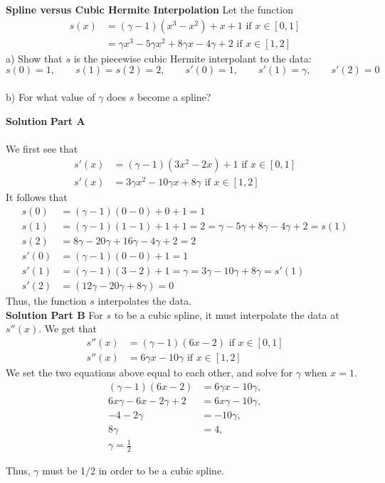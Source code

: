 \textbf{Spline versus Cubic Hermite Interpolation} Let the function 
\begin{align*}
s(x) &= (\gamma - 1)(x^3 - x^2) + x + 1 \text{ if } x \in [0, 1] \\
	 &= \gamma x^3 - 5 \gamma x^2 + 8 \gamma x - 4 \gamma + 2 \text{ if } x \in [1, 2]
\end{align*}
a) Show that $s$ is the piecewise cubic Hermite interpolant to the data:
$$s(0) = 1, \qquad s(1) = s(2) = 2, \qquad s'(0) = 1, \qquad s'(1) = \gamma, \qquad s'(2) = 0$$
\\
b) For what value of $\gamma$ does $s$ become a spline?

\textbf{Solution}
\textbf{Part A}\\
\\
We first see that
\begin{align*}
 s'(x) &= (\gamma - 1)(3x^2 - 2x) + 1 \text{ if } x \in [0, 1] \\
 s'(x) &= 3\gamma x^2 - 10 \gamma x + 8 \gamma \text{ if } x \in [1, 2]
\end{align*}
It follows that 
\begin{align*}
s(0) &= (\gamma - 1)(0 - 0) + 0 + 1 = 1\\
s(1) &= (\gamma - 1)(1 - 1) + 1 + 1 = 2 =  \gamma - 5 \gamma + 8 \gamma - 4\gamma + 2 = s(1)\\
s(2) &= 8 \gamma - 20 \gamma + 16 \gamma - 4\gamma + 2 = 2\\
s'(0) &= (\gamma - 1)(0 - 0) + 1 = 1\\
s'(1) &= (\gamma - 1)(3 - 2) + 1 = \gamma =  3 \gamma - 10 \gamma + 8\gamma = s'(1)\\
s'(2) &= (12 \gamma - 20 \gamma + 8 \gamma) = 0
\end{align*}
Thus, the function $s$ interpolates the data.
\\
\textbf{Solution Part B}
For $s$ to be a cubic spline, it must interpolate the data at $s''(x)$. We get that 
\begin{align*}
s''(x) &= (\gamma - 1)(6x - 2) \text{ if } x \in [0, 1]\\
s''(x) &= 6 \gamma x - 10 \gamma \text{ if } x \in [1, 2]
\end{align*}
We set the two equations above equal to each other, and solve for $\gamma$ when $x = 1$.
\begin{align*}
(\gamma - 1)(6x - 2) &= 6 \gamma x - 10\gamma, \\
6x \gamma - 6x - 2\gamma + 2 &= 6x \gamma - 10 \gamma,\\
-4 - 2 \gamma &= -10 \gamma, \\
8 \gamma &= 4,\\
\gamma = \frac{1}{2}
\end{align*}

Thus, $\gamma$ must be 1/2 in order to be a cubic spline.

